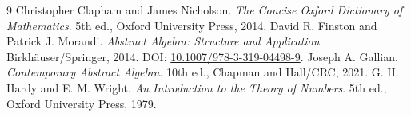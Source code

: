 \documentclass[11pt,a4paper]{article}
\theoremstyle{definition}
\theoremstyle{remark}
\begin{document}
\begin{thebibliography}{9}
Christopher Clapham and James Nicholson.
\emph{The Concise Oxford Dictionary of Mathematics}. 5th ed., Oxford University Press, 2014.
David R. Finston and Patrick J. Morandi.
\emph{Abstract Algebra: Structure and Application}. Birkh\"auser/Springer, 2014. DOI: \href{https://doi.org/10.1007/978-3-319-04498-9}{10.1007/978-3-319-04498-9}.
Joseph A. Gallian.
\emph{Contemporary Abstract Algebra}. 10th ed., Chapman and Hall/CRC, 2021.
G. H. Hardy and E. M. Wright.
\emph{An Introduction to the Theory of Numbers}. 5th ed., Oxford University Press, 1979.
\end{thebibliography}
\end{document}
